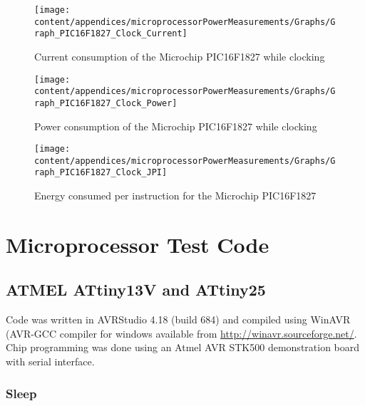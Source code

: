 \begin{figure}
\begin{centering}
\texttt{[image: content/appendices/microprocessorPowerMeasurements/Graphs/Graph\_PIC16F1827\_Clock\_Current]}
\par\end{centering}

\protect\caption{\label{fig:16F1827ClkCurrent}Current consumption of the Microchip
PIC16F1827 while clocking}


\end{figure}
\begin{figure}
\begin{centering}
\texttt{[image: content/appendices/microprocessorPowerMeasurements/Graphs/Graph\_PIC16F1827\_Clock\_Power]}
\par\end{centering}

\protect\caption{
\label{fig:16F1827ClkPower}Power consumption of the Microchip PIC16F1827
while clocking
}


\end{figure}
\begin{figure}
\begin{centering}
\texttt{[image: content/appendices/microprocessorPowerMeasurements/Graphs/Graph\_PIC16F1827\_Clock\_JPI]}
\par\end{centering}

\protect\caption{
\label{fig:16F1827ClkJPI}Energy consumed per instruction for the
Microchip PIC16F1827
}


\end{figure}



\section{Microprocessor Test Code}


\subsection{ATMEL ATtiny13V and ATtiny25}

Code was written in AVRStudio 4.18 (build 684) and compiled using
WinAVR (AVR-GCC compiler for windows available from \url{http://winavr.sourceforge.net/}.
Chip programming was done using an Atmel AVR STK500 demonstration
board with serial interface.


\subsubsection{Sleep}

